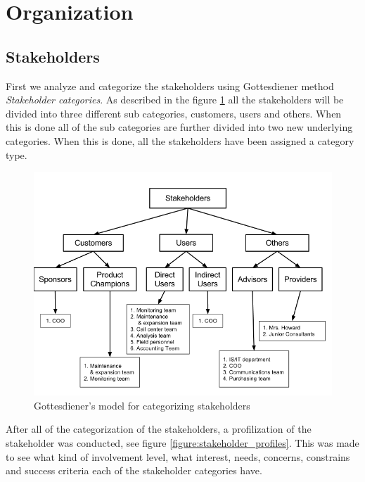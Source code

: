 \documentclass[a4paper]{article}
\begin{document}
\section{Organization}
\label{sec:organization}

\subsection{Stakeholders}
\label{sub:stakeholders}
First we analyze and categorize the stakeholders using Gottesdiener method \emph{Stakeholder categories}. As described in the figure \ref{figure:stakeholder_categorization} all the stakeholders will be divided into three different sub categories, customers, users and others. When this is done all of the sub categories are further divided into two new underlying categories. When this is done, all the stakeholders have been assigned a category type. 

\begin{figure}[H]
	\includegraphics[width=1\textwidth]{images/stakeholder_categorization.png}
	\caption{Gottesdiener's model for categorizing stakeholders \cite{gott3}}
	\label{figure:stakeholder_categorization}                      	
\end{figure}

After all of the categorization of the stakeholders, a profilization of the stakeholder was conducted, see figure \ref{figure:stakeholder_profiles}. This was made to see what kind of involvement level, what interest, needs, concerns, constrains and success criteria each of the stakeholder categories have.
\end{document}
